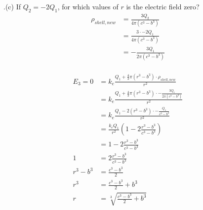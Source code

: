 \documentclass[11pt]{article}
\begin{document}
.(c) If \(Q_2 = -2Q_1\), for which values of \(r\) is the electric field zero?
\begin{align*}
\rho_{shell, new} &= \frac{3 Q_{2}}{4 \pi ( c^3 - b^3 )} \\
    &= \frac{3 \cdot -2Q_1}{4 \pi ( c^3 - b^3 )} \\
    &= - \frac{3 Q_1}{2 \pi ( c^3 - b^3 )} \\
\end{align*}

\begin{align*}
E_3 = 0 &= k_e \frac{Q_1 + \frac{4}{3} \pi (r^3 - b^3) \cdot \rho_{shell, new}}{r^2} \\
    &= k_e \frac{Q_1 + \frac{4}{3} \pi (r^3 - b^3) \cdot - \frac{3 Q_1}{2 \pi ( c^3 - b^3 )}}{r^2} \\
    &= k_e \frac{Q_1 - 2 (r^3 - b^3) \cdot - \frac{Q_1}{c^3 - b^3}}{r^2} \\
    &= \frac{k_e Q_1}{r^2} (1 - 2 \frac{r^3 - b^3}{c^3 - b^3}) \\
    &= 1 - 2 \frac{r^3 - b^3}{c^3 - b^3} \\
  1 &= 2 \frac{r^3 - b^3}{c^3 - b^3} \\
r^3 - b^3 &= \frac{c^3 - b^3}{2} \\
r^3 &= \frac{c^3 - b^3}{2} + b^3 \\
  r &= \sqrt[3]{\frac{c^3 - b^3}{2} + b^3} \\
\end{align*}
\end{document}
